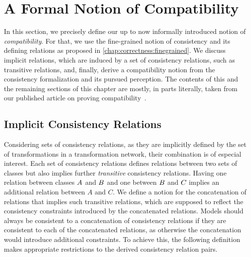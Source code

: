\section{A Formal Notion of Compatibility}
\label{chap:compatibility:formal_notion}

In this section, we precisely define our up to now informally introduced notion of \emph{compatibility}.
For that, we use the fine-grained notion of consistency and its defining relations as proposed in \autoref{chap:correctness:finegrained}.
We discuss implicit relations, which are induced by a set of consistency relations, such as transitive relations, and,
finally, derive a compatibility notion from the consistency formalization and its pursued perception.
The contents of this and the remaining sections of this chapter are mostly, in parts literally, taken from our published article on proving compatibility~.


\subsection{Implicit Consistency Relations}

Considering sets of consistency relations, as they are implicitly defined by the set of transformations in a transformation network, their combination is of especial interest.
Each set of consistency relations defines relations between two sets of classes but also implies further \emph{transitive} consistency relations.
Having one relation between classes $\class{A}{}$ and $\class{B}{}$ and one between $\class{B}{}$ and $\class{C}{}$ implies an additional relation between $A$ and $C$.
We define a notion for the concatenation of relations that implies such transitive relations, which are supposed to reflect the consistency constraints introduced by the concatenated relations.
Models should always be consistent to a concatenation of consistency relations if they are consistent to each of the concatenated relations, as otherwise the concatenation would introduce additional constraints.
To achieve this, the following definition makes appropriate restrictions to the derived consistency relation pairs.

